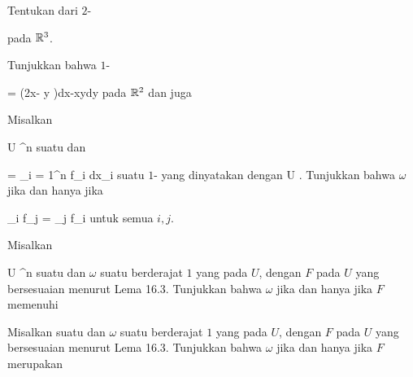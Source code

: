 {}
{

Tentukan
 dari
$2$-

 {  }
 pada ${\mathbb R}^3$.

}
{} {}

{}
{

Tunjukkan bahwa
$1$-

\mavergleichskette
{\vergleichskette
{ \omega
}
{ = }{ (2x- \sin  y )dx-x\cos  ydy
}
{  }{
}
{    }{
}
{   }{
}
}
{}{}{}
pada ${\mathbb R}^2$
dan juga

}
{} {}

{}
{

Misalkan

\mavergleichskette
{\vergleichskette
{ U
}
{ \subseteq }{ \R^n
}
{  }{
}
{    }{
}
{   }{
}
}
{}{}{}
suatu
dan

\mavergleichskette
{\vergleichskette
{ \omega
}
{ = }{ \sum_{i = 1}^n f_i dx_i
}
{  }{
}
{    }{
}
{   }{
}
}
{}{}{}
suatu
$1$-
yang dinyatakan dengan
 { U } { \R
} {}.
Tunjukkan bahwa $\omega$
jika dan hanya jika

\mavergleichskettedisp
{\vergleichskette
{ \partial_i f_j
}
{ =} { \partial_j f_i
}
{ } {
}
{ } {
}
{ } {
}
}
{}{}{}
untuk semua $i,j$.

}
{} {}

{}
{

Misalkan

\mavergleichskette
{\vergleichskette
{ U
}
{ \subseteq }{ \R^n
}
{  }{
}
{    }{
}
{   }{
}
}
{}{}{}
suatu
dan $\omega$ suatu
 berderajat $1$ yang
pada $U$, dengan
$F$ pada $U$ yang bersesuaian menurut
Lema 16.3.
Tunjukkan bahwa $\omega$
jika dan hanya jika $F$ memenuhi

}
{} {}

{}
{

Misalkan
 suatu
dan $\omega$ suatu
 berderajat $1$ yang
pada $U$, dengan
$F$ pada $U$ yang bersesuaian menurut
Lema 16.3.
Tunjukkan bahwa $\omega$
jika dan hanya jika $F$ merupakan

}
{} {}

